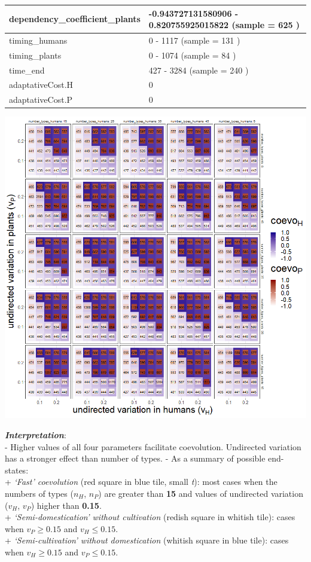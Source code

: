 \documentclass[
]{book}
\begin{document}
\begin{table}[!h]
\begin{tabular}[t]{l|l}
\hline
dependency\_coefficient\_plants & -0.943727131580906 - 0.820755925015822 (sample = 625 )\\
\hline
timing\_humans & 0 - 1117 (sample = 131 )\\
\hline
timing\_plants & 0 - 1074 (sample = 84 )\\
\hline
time\_end & 427 - 3284 (sample = 240 )\\
\hline
adaptativeCost.H & 0\\
\hline
adaptativeCost.P & 0\\
\hline
\end{tabular}
\end{table}

\newpage

\includegraphics[width=1\linewidth]{plots/4_exp_types_number_and_variation-tripleRaster_fourParameterss}

\textbf{\emph{Interpretation}}:\\
- Higher values of all four parameters facilitate coevolution. Undirected variation has a stronger effect than number of types.
- As a summary of possible end-states:\\
+ \emph{`Fast' coevolution} (red square in blue tile, small \emph{t}): most cases when the numbers of types (\(n_{H}\), \(n_{P}\)) are greater than \textbf{15} and values of undirected variation (\(v_{H}\), \(v_{P}\)) higher than \textbf{0.15}.\\
+ \emph{`Semi-domestication' without cultivation} (redish square in whitish tile): cases when \(v_{P}\geq 0.15\) and \(v_{H}\leq 0.15\).\\
+ \emph{`Semi-cultivation' without domestication} (whitish square in blue tile): cases when \(v_{H}\geq 0.15\) and \(v_{P}\leq 0.15\).
\end{document}
